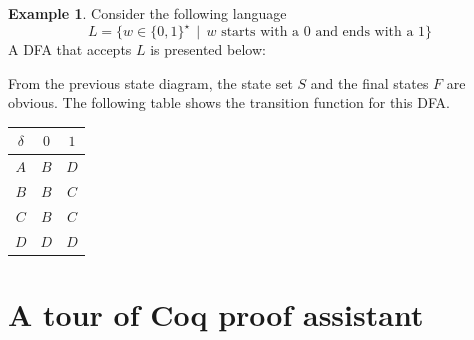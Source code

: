 \documentclass[oneside,12pt]{scrbook}
\theoremstyle{definition}
\newtheorem{Example}{Example}
\theoremstyle{plain}
\theoremstyle{definition}
\begin{document}
\begin{Example}
  Consider the following language \begin{equation*}L =\{w \in\{0,1\}^\star\,\mid\,w \text{ starts with a 0 and ends with a 1}\}\end{equation*}
  A DFA that accepts $L$ is presented below:
  \begin{figure}[h]
    \centering
  \end{figure}

  From the previous state diagram, the state set $S$ and the final states $F$ are obvious. The following table
  shows the transition function for this DFA.

  \begin{table}[h]
    \begin{tabular}{ccc}
      $\delta$ & $0$ & $1$ \\ \hline
      $A$      & $B$ & $D$ \\
      $B$      & $B$ & $C$ \\
      $C$      & $B$ & $C$ \\
      $D$      & $D$ & $D$ \\
    \end{tabular}
    \centering
  \end{table}
\end{Example}

\section{A tour of Coq proof assistant}\label{section:coq}
\end{document}
